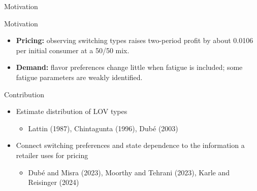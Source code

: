 \documentclass[aspectratio=169,11pt]{beamer}
\begin{document}
\begin{frame}{Motivation}
\begin{block}{Motivation}
\begin{itemize}
\item \textbf{Pricing:} observing switching types raises two-period profit by about 0.0106 per initial consumer at a 50/50 mix.
\item \textbf{Demand:} flavor preferences change little when fatigue is included; some fatigue parameters are weakly identified.
\end{itemize}
\end{block}
\begin{block}{Contribution}
\begin{itemize}
  \item Estimate distribution of LOV types 
  \begin{itemize}
    \item Lattin (1987), Chintagunta (1996), Dub\'e (2003)
  \end{itemize}
  \item Connect switching preferences and state dependence to the information a retailer uses for pricing
  \begin{itemize}
    \item Dub\'e and Misra (2023), Moorthy and Tehrani (2023), Karle and Reisinger (2024)
  \end{itemize}
\end{itemize}
\end{block}
\end{frame}
\end{document}
